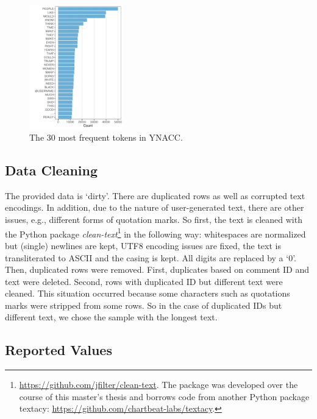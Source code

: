 \begin{figure}
  \begin{center}
    \includegraphics[width=0.36\textwidth]{graphs/eda/word_freq}
  \end{center}
  \caption{The 30 most frequent tokens in YNACC.}
  \label{fig:word_freq}
\end{figure}

\subsection{Data Cleaning}
\label{subsec:ynacc_data_cleaning}

The provided data is `dirty'.
There are duplicated rows as well as corrupted text encodings.
In addition, due to the nature of user-generated text, there are other issues, e.g., different forms of quotation marks. So first, the text is cleaned with the Python package \textit{clean-text}\footnote{\url{https://github.com/jfilter/clean-text}. The package was developed over the course of this master's thesis and borrows code from another Python package textacy: \url{https://github.com/chartbeat-labs/textacy}.} in the following way: whitespaces are normalized but (single) newlines are kept, UTF8 encoding issues are fixed, the text is transliterated to ASCII and the casing is kept. All digits are replaced by a `0'.
Then, duplicated rows were removed.
First, duplicates based on comment ID and text were deleted.
Second, rows with duplicated ID but different text were cleaned.
This situation occurred because some characters such as quotations marks were stripped from some rows.
So in the case of duplicated IDs but different text, we chose the sample with the longest text.

\subsection{Reported Values}
\label{subsec:ynacc_reported}

